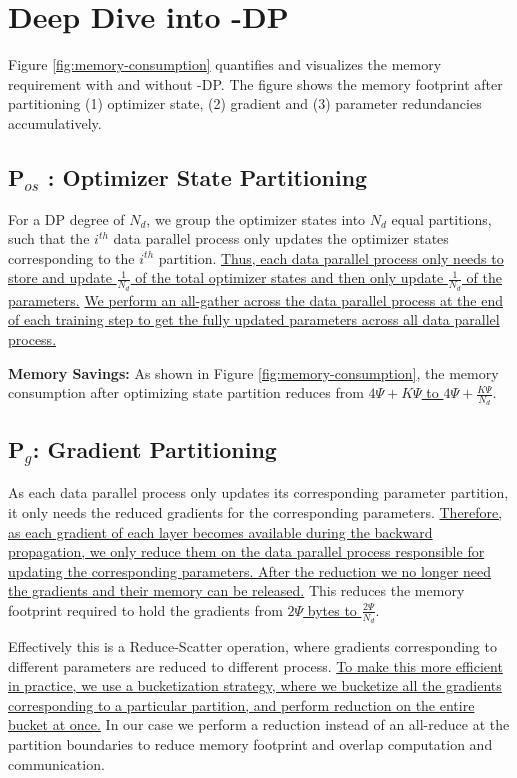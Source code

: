 \section{Deep Dive into \name-DP}\label{sec:memoryoptimization}

Figure \ref{fig:memory-consumption} quantifies and visualizes the memory requirement with and without \name-DP. The figure shows the memory footprint after partitioning (1) optimizer state, (2) gradient and (3) parameter redundancies accumulatively.

\subsection{P$_{os}$ : Optimizer State Partitioning }\label{sec:pos}

For a DP degree of $N_d$, we group the optimizer states into $N_d$ equal partitions, such that the $i^{th}$ data parallel process only updates the optimizer states corresponding to the $i^{th}$ partition. \uline{Thus, each data parallel process only needs to store and update $\frac{1}{N_d}$ of the total optimizer states and then only update $\frac{1}{N_d}$ of the parameters.} 
\uline{We perform an all-gather across the data parallel process at the end of each training step to get the fully updated parameters across all data parallel process.}

\textbf{Memory Savings: } As shown in Figure \ref{fig:memory-consumption}, the memory consumption after optimizing state partition reduces from \uline{$4\Psi+K\Psi$ to $4\Psi + \frac{K\Psi}{N_d}$}.

\subsection{P$_g$: Gradient Partitioning}\label{sec:pg}

As each data parallel process only updates its corresponding parameter partition, it only needs the reduced gradients for the corresponding parameters. \uline{Therefore, as each gradient of each layer becomes available during the backward propagation, we only reduce them on the data parallel process responsible for updating the corresponding parameters. After the reduction we no longer need the gradients and their memory can be released.} This reduces the memory footprint required to hold the gradients from \uline{$2\Psi$ bytes to $\frac{2\Psi}{N_d}$}. 

Effectively this is a Reduce-Scatter operation, where gradients corresponding to different parameters are reduced to different process. \uline{To make this more efficient in practice, we use a bucketization strategy, where we bucketize all the gradients corresponding to a particular partition, and perform reduction on the entire bucket at once.} In our case we perform a reduction instead of an all-reduce at the partition boundaries to reduce memory footprint and overlap computation and communication.

